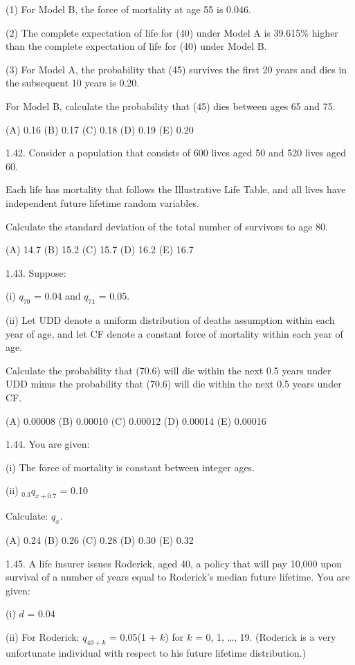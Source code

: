 \documentclass[]{book}
\begin{document}
(1) For Model B, the force of mortality at age 55 is 0.046.

(2) The complete expectation of life for (40) under Model A is 39.615\%
higher than the complete expectation of life for (40) under Model B.

(3) For Model A, the probability that (45) survives the first 20 years
and dies in the subsequent 10 years is 0.20.

For Model B, calculate the probability that (45) dies between ages 65
and 75.

(A) 0.16 (B) 0.17 (C) 0.18 (D) 0.19 (E) 0.20

1.42. Consider a population that consists of 600 lives aged 50 and 520
lives aged 60.

Each life has mortality that follows the Illustrative Life Table, and
all lives have independent future lifetime random variables.

Calculate the standard deviation of the total number of survivors to age
80.

(A) 14.7 (B) 15.2 (C) 15.7 (D) 16.2 (E) 16.7

1.43. Suppose:

(i) \(q_{70}\) = 0.04 and \(q_{71}\) = 0.05.

(ii) Let UDD denote a uniform distribution of deaths assumption within
each year of age, and let CF denote a constant force of mortality within
each year of age.

Calculate the probability that (70.6) will die within the next 0.5 years
under UDD minus the probability that (70.6) will die within the next 0.5
years under CF.

(A) 0.00008 (B) 0.00010 (C) 0.00012 (D) 0.00014 (E) 0.00016

1.44. You are given:

(i) The force of mortality is constant between integer ages.

(ii) \({}_{0.3}q_{x + 0.7}\) = 0.10

Calculate: \(q_x\).

(A) 0.24 (B) 0.26 (C) 0.28 (D) 0.30 (E) 0.32

1.45. A life insurer issues Roderick, aged 40, a policy that will pay
10,000 upon survival of a number of years equal to Roderick's median
future lifetime. You are given:

(i) \(d\) = 0.04

(ii) For Roderick: \(q_{40 + k}\) = 0.05(1 + \(k\)) for \(k\) = 0, 1,
\ldots{}, 19. (Roderick is a very unfortunate individual with respect to
his future lifetime distribution.)
\end{document}
